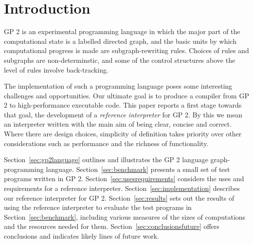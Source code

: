 \section{Introduction}

GP 2 is an experimental programming language in which the major part of
the computational state is a labelled directed graph, and the basic
units by which computational progress is made are subgraph-rewriting
rules.
Choices of rules and subgraphs are non-determinstic, and some of
the control structures above the level of rules involve back-tracking.

The implementation of such a programming language poses some
interesting challenges and opportunities.
Our ultimate goal is to produce a compiler from GP 2 to
high-performance executable code.
This paper reports a first stage towards that goal, the development
of a \emph{reference interpreter} for GP 2.
By this we mean an interpreter written with the main aim of
being clear, concise and correct.
Where there are design choices, simplicity of
definition takes priority over other considerations
such as performance and the richness of functionality.

Section~\ref{sec:gp2language} outlines and illustrates the GP 2 language
graph-programming language.
Section~\ref{sec:benchmark} presents a small set of test programs
written in GP 2.
Section~\ref{sec:usesrequirements} considers the uses and requirements
for a reference interpreter.
Section~\ref{sec:implementation} describes our reference interpreter for
GP 2.
Section~\ref{sec:results} sets out the results of using the reference
interpreter to evaluate the test programs in Section~\ref{sec:benchmark},
including various measures of the sizes of computations and the
resources needed for them.
Section~\ref{sec:conclusionsfuture} offers conclusions and indicates
likely lines of future work.

